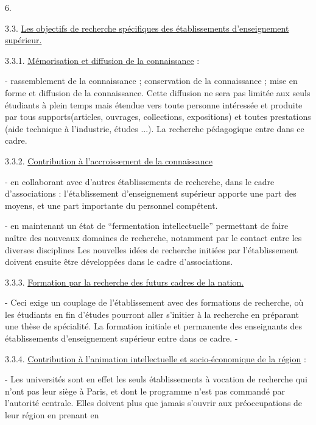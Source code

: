 
\begin{flushright}6.\end{flushright}

3.3. \uline{Les objectifs de recherche spécifiques des établissements d'enseignement supérieur.}

3.3.1. \uline{Mémorisation et diffusion de la connaissance} :

- rassemblement de la connaissance ; conservation de la connaissance ; mise en forme et diffusion de la connaissance. Cette diffusion ne sera pas limitée aux seuls étudiants à plein temps mais étendue vers toute personne intéressée et produite par tous supports(articles, ouvrages, collections, expositions) et toutes prestations (aide technique à l'industrie, études ...). La recherche pédagogique entre dans ce cadre.

3.3.2. \uline{Contribution à l'accroissement de la connaissance}

- en collaborant avec d'autres établissements de recherche, dans le cadre d'associations : l'établissement d'enseignement supérieur apporte une part des moyens, et une part importante du personnel compétent.

- en maintenant un état de ``fermentation intellectuelle'' permettant de faire naître des nouveaux domaines de recherche, notamment par le contact entre les diverses disciplines Les nouvelles idées de recherche\inserted{,} initiées par l'établissement\inserted{,} doivent\inserted{,} ensuite être développées dans le cadre d'associations.

3.3.3. \uline{Formation par la recherche des futurs cadres de la nation.}

- Ceci exige un couplage de l'établissement avec des formations de recherche, où les étudiants en fin d'études pourront aller s'initier à la recherche en préparant une thèse de spécialité. La formation initiale et permanente des enseignants des établissements d'enseignement supérieur entre dans ce cadre. -

3.3.4. \uline{Contribution à l'animation intellectuelle et socio-économique de la région} :

- Les universités sont en effet les seuls établissements à vocation de recherche qui n'ont pas leur siège à Paris, et dont le programme n'est pas commandé par l'autorité centrale. Elles doivent plus que jamais s'ouvrir aux préoccupations de leur région en prenant en

